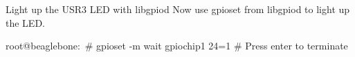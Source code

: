 \begin{Lab}
\begin{exe} {Light up the USR3 LED with libgpiod}
   Now use gpioset from libgpiod to light up the LED.

   \begin{sol}
      \begin{raw}
root@beaglebone:~# gpioset -m wait gpiochip1 24=1
# Press enter to terminate
      \end{raw}
   \end{sol}
\end{exe}

\end{Lab}

